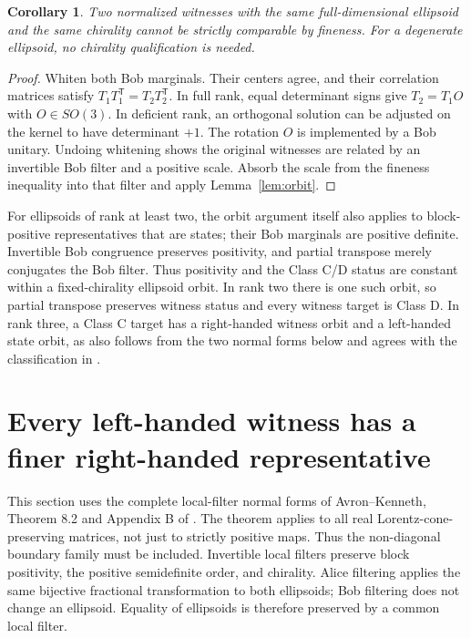 \documentclass[11pt,a4paper]{article}
\newtheorem{corollary}[theorem]{Corollary}
\theoremstyle{definition}\newtheorem{definition}[theorem]{Definition}
\theoremstyle{plain}\newtheorem*{theorem*}{Theorem}
\begin{document}
\begin{corollary}\label{cor:sameE}
Two normalized witnesses with the same full-dimensional ellipsoid and the same chirality cannot be strictly comparable by fineness. For a degenerate ellipsoid, no chirality qualification is needed.
\end{corollary}
\begin{proof}
Whiten both Bob marginals. Their centers agree, and their correlation matrices satisfy $T_1T_1^{\mathsf T}=T_2T_2^{\mathsf T}$. In full rank, equal determinant signs give $T_2=T_1O$ with $O\in SO(3)$. In deficient rank, an orthogonal solution can be adjusted on the kernel to have determinant $+1$. The rotation $O$ is implemented by a Bob unitary. Undoing whitening shows the original witnesses are related by an invertible Bob filter and a positive scale. Absorb the scale from the fineness inequality into that filter and apply Lemma~\ref{lem:orbit}.
\end{proof}

For ellipsoids of rank at least two, the orbit argument itself also applies to block-positive representatives that are states; their Bob marginals are positive definite. Invertible Bob congruence preserves positivity, and partial transpose merely conjugates the Bob filter. Thus positivity and the Class C/D status are constant within a fixed-chirality ellipsoid orbit. In rank two there is one such orbit, so partial transpose preserves witness status and every witness target is Class D. In rank three, a Class C target has a right-handed witness orbit and a left-handed state orbit, as also follows from the two normal forms below and agrees with the classification in \cite{milne}.

\section{Every left-handed witness has a finer right-handed representative}

This section uses the complete local-filter normal forms of Avron--Kenneth, Theorem 8.2 and Appendix B of \cite{avron}. The theorem applies to all real Lorentz-cone-preserving matrices, not just to strictly positive maps. Thus the non-diagonal boundary family must be included. Invertible local filters preserve block positivity, the positive semidefinite order, and chirality. Alice filtering applies the same bijective fractional transformation to both ellipsoids; Bob filtering does not change an ellipsoid. Equality of ellipsoids is therefore preserved by a common local filter.
\end{document}
